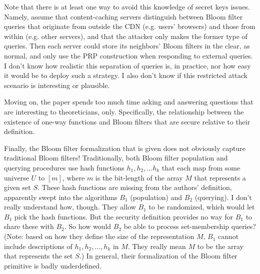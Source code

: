 Note that there is at least one way to avoid this knowledge of secret keys issues.  Namely, assume that content-caching servers distinguish between Bloom filter queries that originate from outside the CDN (e.g. users’ browsers) and those from within (e.g. other servers), and that the attacker only makes the former type of queries.  Then each server could store its neighbors’ Bloom filters in the clear, as normal, and only use the PRP construction when responding to external queries.  I don’t know how realistic this separation of queries is, in practice, nor how easy it would be to deploy such a strategy.  I also don’t know if this restricted attack scenario is interesting or plausible.

Moving on, the paper spends too much time asking and answering questions that are interesting to theoreticians, only.  Specifically, the relationship between the existence of one-way functions and Bloom filters that are secure relative to their definition.


Finally, the Bloom filter formalization that is given does not obviously capture traditional Bloom filters!  Traditionally, both Bloom filter population and querying procedures use hash functions $h_1,h_2,...h_k$ that each map from some universe $U$ to $[m]$, where $m$ is the bit-length of the array $M$ that represents a given set $S$.  These hash functions are missing from the authors’ definition, apparently swept into the algorithms $B_1$ (population) and $B_2$ (querying).  I don't really understand how, though. They allow $B_1$ to be randomized, which would let $B_1$ pick the hash functions.  But the security definition provides no way for $B_1$ to share these with $B_2$.  So how would $B_2$ be able to process set-membership queries?  (Note: based on how they define the size of the representation $M$, $B_1$ cannot include descriptions of $h_1, h_2, \ldots , h_k$ in $M$.  They really mean $M$ to be the array that represents the set $S$.)  In general, their formalization of the Bloom filter primitive is badly underdefined.



